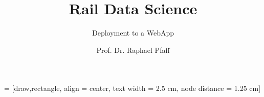 \documentclass[slidestop,compress,mathserif, aspectratio = 169]{beamer}
\begin{document}
 = [draw,rectangle, align = center, text width = 2.5 cm, node distance = 1.25 cm]

\newcommand{\Var}{\operatorname{Var}}
\newcommand{\mum}{\operatorname{\mu m}}
\newcommand{\E}{\operatorname{E}}
\newcommand{
\offslide}[2]{
\begin{frame}
\frametitle{\includegraphics[scale=0.05] {Offwhite} \hspace{.5mm} #1}
\begin{tikzpicture}[x=1cm, y=1cm, semitransparent]
\draw[step=5mm, line width=0.2mm, black!40!white] (0,0) grid (\textwidth,\textheight-1cm);
\node[anchor = south east] at (\textwidth,0) {#2};

\end{tikzpicture}
\end{frame}
}
\newcommand{\source}[1]{\rotatebox{90}{\tiny \color{gray} #1}}

\newcommand{\lehrtext}[1]{
\only<article>{
\vspace{0.3cm}
\leavevmode%
  \tabto*{-1.8cm}%
  \smash{\belowbaseline[-\ht\strutbox]{\makebox[0pt]%
    [l]%
  {\texttt{[image: teacher]}}}}%
  \tabto*{\TabPrevPos}%
#1
}
}

\title{Rail Data Science}
\subtitle{Deployment to a WebApp}
\author{Prof. Dr. Raphael Pfaff}

\begin{frame} %
\titlepage
\end{frame}

\end{document}
